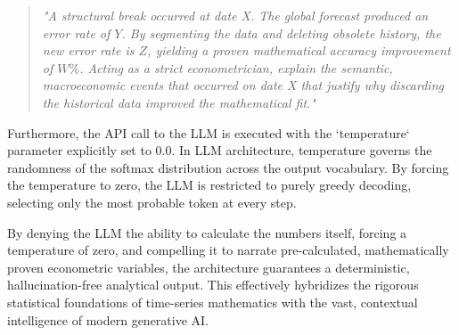 \begin{quote}
\textit{"A structural break occurred at date X. The global forecast produced an error rate of $Y$. By segmenting the data and deleting obsolete history, the new error rate is $Z$, yielding a proven mathematical accuracy improvement of $W\%$. Acting as a strict econometrician, explain the semantic, macroeconomic events that occurred on date X that justify why discarding the historical data improved the mathematical fit."}
\end{quote}

Furthermore, the API call to the LLM is executed with the `temperature` parameter explicitly set to $0.0$. In LLM architecture, temperature governs the randomness of the softmax distribution across the output vocabulary. By forcing the temperature to zero, the LLM is restricted to purely greedy decoding, selecting only the most probable token at every step. 

By denying the LLM the ability to calculate the numbers itself, forcing a temperature of zero, and compelling it to narrate pre-calculated, mathematically proven econometric variables, the architecture guarantees a deterministic, hallucination-free analytical output. This effectively hybridizes the rigorous statistical foundations of time-series mathematics with the vast, contextual intelligence of modern generative AI.
